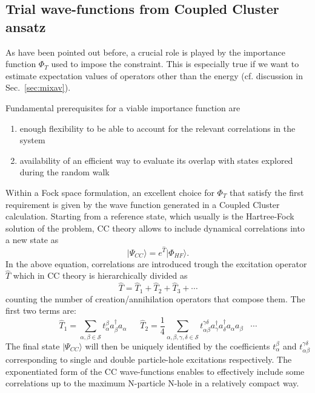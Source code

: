 
\subsection{Trial wave-functions from Coupled Cluster ansatz}
As have been pointed out before, a crucial role is played by the
importance function $\Phi_T$ used to impose the constraint. This is especially true if we want
to estimate expectation values of operators other than the energy (cf. discussion in Sec.~\ref{sec:mixav}).

Fundamental prerequisites for a viable importance function are
\begin{enumerate}
 \item enough flexibility to be able to account for the relevant correlations in the system
 \item availability of an efficient way to evaluate its overlap with states explored during the random walk
\end{enumerate}

Within a Fock space formulation, an excellent choice for $\Phi_T$ that satisfy the first requirement is given by the wave 
function generated in a Coupled Cluster calculation. Starting from a reference state,
which usually is the Hartree-Fock solution of the problem, CC theory allows to
include dynamical correlations into a new state as
\begin{equation}
\label{eq:ccwf}
\vert \Psi_{CC}\rangle = e^{\hat{T}}\vert \Phi_{HF} \rangle.
\end{equation}
In the above equation, correlations are introduced trough the excitation operator $\hat{T}$ which
in CC theory is hierarchically divided as 
\begin{equation}
\hat{T}=\hat{T}_1+\hat{T}_2 + \hat{T}_3+\cdots 
\end{equation}
counting the number of creation/annihilation operators that compose them. The first two terms are:
\begin{equation}
\hat{T}_1=\sum_{\alpha,\beta \in \mathcal{S}} t_\alpha^\beta a^{\dagger}_\beta a_\alpha
 \;\quad\; \hat{T}_2=\frac{1}{4}\sum_{\alpha,\beta,\gamma,\delta \in \mathcal{S}} t_{\alpha\beta}^{\gamma\delta} a^{\dagger}_\gamma a^{\dagger}_\delta a_\alpha a_\beta \;\;\; \cdots
\end{equation}
The final state $\vert \Psi_{CC}\rangle$ will then be uniquely identified by the coefficients $t_\alpha^\beta$ and $t_{\alpha\beta}^{\gamma\delta}$ corresponding
to single and double particle-hole excitations respectively. The exponentiated form of the CC wave-functions enables to effectively include
some correlations up to the maximum N-particle N-hole in a relatively compact way.

